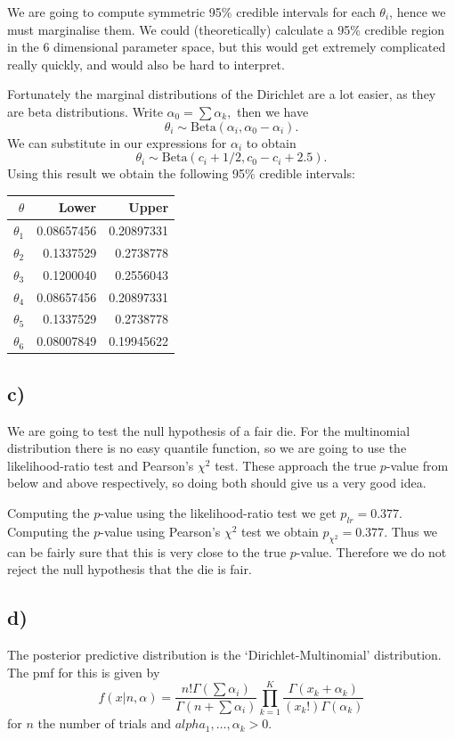 \documentclass[10pt]{extarticle}
\begin{document}
We are going to compute symmetric 95\% credible intervals for each $\theta_i$, hence we must marginalise them. We could (theoretically) calculate a 95\% credible region in the 6 dimensional parameter space, but this would get extremely complicated really quickly, and would also be hard to interpret. 

Fortunately the marginal distributions of the Dirichlet are a lot easier, as they are beta distributions. Write $\alpha_0 = \sum\alpha_k,$ then we have 
$$\theta_i \sim \mathrm{Beta}\left(\alpha_i, \alpha_0 - \alpha_i\right).$$ We can substitute in our expressions for $\alpha_i$ to obtain $$\theta_i \sim \mathrm{Beta}\left(c_i + 1/2, c_0 - c_i + 2.5\right).$$ Using this result we obtain the following 95\% credible intervals:


\begin{table}[H]
	\centering
	\begin{tabular}{r|rr}
		\hline
		$\theta$ & Lower & Upper\\
		\hline
		$\theta_1$ & 0.08657456 &0.20897331\\
		$\theta_2$ &0.1337529 &0.2738778\\
		$\theta_3$ &0.1200040 &0.2556043\\
		$\theta_4$ &0.08657456 &0.20897331\\
		$\theta_5$ &0.1337529 &0.2738778\\
		$\theta_6$ &0.08007849 &0.19945622\\
	\end{tabular}
\end{table}

\subsection*{c)}
We are going to test the null hypothesis of a fair die. For the multinomial distribution there is no easy quantile function, so we are going to use the likelihood-ratio test and Pearson's $\chi^2$ test. These approach the true $p$-value from below and above respectively, so doing both should give us a very good idea.

Computing the $p$-value using the likelihood-ratio test we get $p_{lr} = 0.377$. Computing the $p$-value using Pearson's $\chi^2$ test we obtain $p_{\chi^2} = 0.377$. Thus we can be fairly sure that this is very close to the true $p$-value. Therefore we do not reject the null hypothesis that the die is fair.

\subsection*{d)}
The posterior predictive distribution is the `Dirichlet-Multinomial' distribution. The pmf for this is given by 
\[
f(x|n, \alpha) = \frac{n!\Gamma(\sum\alpha_i)}{\Gamma(n+\sum\alpha_i)}\prod_{k=1}^{K}\frac{\Gamma(x_k+\alpha_k)}{(x_k!)\Gamma(\alpha_k)}
\]
for $n$ the number of trials and $alpha_1, \dots, \alpha_k > 0.$ 
\end{document}
